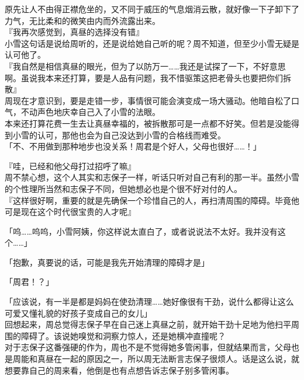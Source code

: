 原先让人不由得正襟危坐的，又不同于威压的气息烟消云散，就好像一下子卸下了力气，无比柔和的微笑由内而外流露出来。\\

『我再次感觉到，真昼的选择没有错』\\

小雪这句话是说给周听的，还是说给她自己听的呢？周不知道，但至少小雪无疑是认可他了。\\

『我自然是相信真昼的眼光，但为了以防万一……我还是试探了一下，不好意思啊。虽说我本来还打算，要是人品有问题，我不惜驱策这把老骨头也要把你们拆散』\\

周现在才意识到，要是走错一步，事情很可能会演变成一场大骚动。他暗自松了口气，不动声色地庆幸自己入了小雪的法眼。\\

本来还打算花费一生去让真昼幸福的，被拆散那可是一点都不好笑。但若是没能得到小雪的认可，那他也会为自己没达到小雪的合格线而难受。\\

「不、不用做到那种地步也没关系！周君是个好人，父母也很好……！」

『哇，已经和他父母打过招呼了嘛』\\

周不禁心想，这个人其实和志保子一样，听话只听对自己有利的那一半。虽然小雪的个性理所当然和志保子不同，但她想必也是个很不好对付的人。\\

『这样很好啊，重要的就是先确保一个珍惜自己的人，再扫清周围的障碍。毕竟他可是现在这个时代很宝贵的人才呢』

「呜……呜呜，小雪阿姨，你这样说太直白了，或者说说法不太好。我并没有这个……」

「抱歉，真要说的话，可能是我先开始清理的障碍才是」

「周君！？」

「应该说，有一半是都是妈妈在使劲清理……她好像很有干劲，说什么都得让这么可爱又懂礼貌的好孩子变成自己的女儿」\\

回想起来，周总觉得志保子早在自己迷上真昼之前，就开始干劲十足地为他扫平周围的障碍了。该说她嗅觉和洞察力惊人，还是她横冲直撞呢？\\

对于志保子这番强硬的作为，周也不是不觉得她多管闲事，但就结果而言，父母也是周能和真昼在一起的原因之一，所以周无法断言志保子很烦人。话是这么说，就想要靠自己的周来看，他倒是也有点想告诉志保子别多管闲事。\\

